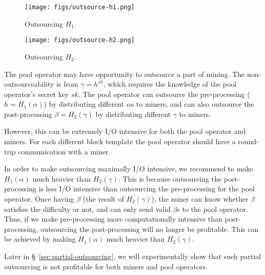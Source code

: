 \begin{figure}[htp]
    \centering
    \texttt{[image: figs/outsource-h1.png]}
    \caption{Outsourcing $H_1$.}
    \label{fig:outsource-h1}
\end{figure}
\begin{figure}[htp]
    \centering
    \texttt{[image: figs/outsource-h2.png]}
    \caption{Outsourcing $H_2$.}
    \label{fig:outsource-h2}
\end{figure}

The pool operator may have opportunity to outsource a part of mining.
The non-outsourceability is from $\gamma = h^{sk}$, which requires the knowledge of the pool operator's secret key $sk$.
The pool operator can outsource the pre-processing ($h = H_1(\alpha)$) by distributing different $\alpha$s to miners, and can also outsource the post-processing $\beta = H_2(\gamma)$ by distributing different $\gamma$ to miners.

However, this can be extremely I/O intensive for both the pool operator and miners.
For each different block template the pool operator should have a round-trip communication with a miner.

In order to make outsourcing maximally I/O intensive, we recommend to make $H_1(\alpha)$ much heavier than $H_2(\gamma)$. 
This is because outsourcing the post-processing is less I/O intensive than outsourcing the pre-processing for the pool operator.
Once having $\beta$ (the result of $H_2(\gamma)$), the miner can know whether $\beta$ satisfies the difficulty or not, and can only send valid $\beta$s to the pool operator.
Thus, if we make pre-processing more computationally intensive than post-processing, outsourcing the post-processing will no longer be profitable.
This can be achieved by making $H_1(\alpha)$ much heavier than $H_2(\gamma)$.

Later in \S~\ref{sec:partial-outsourcing}, we will experimentally show that such partial outsourcing is not profitable for both miners and pool operators.



